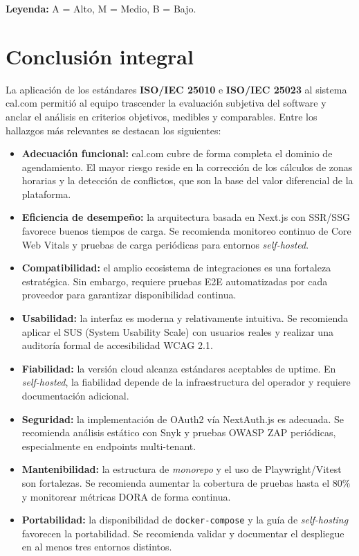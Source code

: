 \documentclass[12pt, a4paper]{article}
\begin{document}
\noindent\textbf{Leyenda:} A = Alto, M = Medio, B = Bajo.

\section{Conclusión integral}

La aplicación de los estándares \textbf{ISO/IEC 25010} e \textbf{ISO/IEC 25023} al
sistema cal.com permitió al equipo trascender la evaluación subjetiva del software y
anclar el análisis en criterios objetivos, medibles y comparables. Entre los hallazgos
más relevantes se destacan los siguientes:

\begin{itemize}
    \item \textbf{Adecuación funcional:} cal.com cubre de forma completa el dominio de agendamiento. El mayor riesgo reside en la corrección de los cálculos de zonas horarias y la detección de conflictos, que son la base del valor diferencial de la plataforma.

    \item \textbf{Eficiencia de desempeño:} la arquitectura basada en Next.js con SSR/SSG favorece buenos tiempos de carga. Se recomienda monitoreo continuo de Core Web Vitals y pruebas de carga periódicas para entornos \textit{self-hosted}.

    \item \textbf{Compatibilidad:} el amplio ecosistema de integraciones es una fortaleza estratégica. Sin embargo, requiere pruebas E2E automatizadas por cada proveedor para garantizar disponibilidad continua.

    \item \textbf{Usabilidad:} la interfaz es moderna y relativamente intuitiva. Se recomienda aplicar el SUS (System Usability Scale) con usuarios reales y realizar una auditoría formal de accesibilidad WCAG 2.1.

    \item \textbf{Fiabilidad:} la versión cloud alcanza estándares aceptables de uptime. En \textit{self-hosted}, la fiabilidad depende de la infraestructura del operador y requiere documentación adicional.

    \item \textbf{Seguridad:} la implementación de OAuth2 vía NextAuth.js es adecuada. Se recomienda análisis estático con Snyk y pruebas OWASP ZAP periódicas, especialmente en endpoints multi-tenant.

    \item \textbf{Mantenibilidad:} la estructura de \textit{monorepo} y el uso de Playwright/Vitest son fortalezas. Se recomienda aumentar la cobertura de pruebas hasta el 80\% y monitorear métricas DORA de forma continua.

    \item \textbf{Portabilidad:} la disponibilidad de \texttt{docker-compose} y la guía de \textit{self-hosting} favorecen la portabilidad. Se recomienda validar y documentar el despliegue en al menos tres entornos distintos.
\end{itemize}
\end{document}
